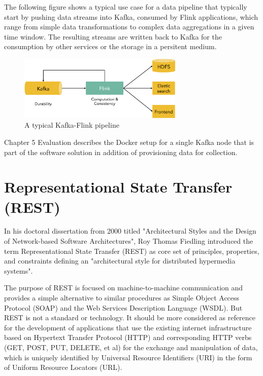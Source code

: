 The following figure shows a typical use case for a data pipeline that typically start by pushing data
streams into Kafka, consumed by Flink applications, which range from simple data transformations
to complex data aggregations in a given time window. The resulting streams are written back to Kafka
for the consumption by other services or the storage in a persitent medium.
\begin{figure}[H]
	\centering
	\includegraphics[width=0.7\textwidth]{../images/05-kafka-flink-pipeline.png}
	\caption{A typical Kafka-Flink pipeline{\cite{Dartisans15}}}
	\label{kafka-flink-pipeline}
\end{figure}

Chapter 5 Evaluation describes the Docker setup for a single Kafka node that is part of the
software solution in addition of provisioning data for collection.

\section{Representational State Transfer (REST)}
In his doctoral dissertation from 2000 titled "Architectural Styles and the Design of
Network-based Software Architectures", Roy Thomas Fiedling introduced the term
Representational State Transfer (REST) as core set of principles, properties, and
constraints defining an "architectural style for distributed hypermedia systems"\cite{Field00}.

The purpose of REST is focused on machine-to-machine communication and provides a simple alternative to similar procedures
as Simple Object Access Protocol (SOAP) and the Web Services Description Language (WSDL). But REST is not a standard or
technology. It should be more considered as reference for the development of applications that use the existing internet
infrastructure based on Hypertext Transfer Protocol (HTTP) and corresponding HTTP verbs (GET, POST, PUT, DELETE, et al) for the
exchange and manipulation of data, which is uniquely identified by Universal Resource Identifiers (URI) in the form of
Uniform Resource Locators (URL).

